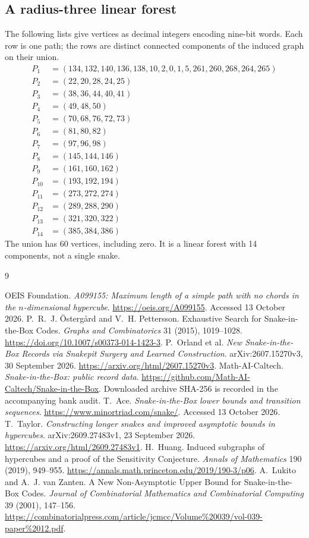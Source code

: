 \documentclass[11pt,a4paper]{article}
\theoremstyle{definition}
\theoremstyle{remark}
\begin{document}
\subsection{A radius-three linear forest}\label{app:radius-three}
The following lists give vertices as decimal integers encoding nine-bit words. Each row is one path; the rows are distinct connected components of the induced graph on their union.
\begin{align*}
P_{1}&=(134,132,140,136,138,10,2,0,1,5,261,260,268,264,265)\\
P_{2}&=(22,20,28,24,25)\\
P_{3}&=(38,36,44,40,41)\\
P_{4}&=(49,48,50)\\
P_{5}&=(70,68,76,72,73)\\
P_{6}&=(81,80,82)\\
P_{7}&=(97,96,98)\\
P_{8}&=(145,144,146)\\
P_{9}&=(161,160,162)\\
P_{10}&=(193,192,194)\\
P_{11}&=(273,272,274)\\
P_{12}&=(289,288,290)\\
P_{13}&=(321,320,322)\\
P_{14}&=(385,384,386)
\end{align*}
The union has 60 vertices, including zero. It is a linear forest with 14 components, not a single snake.

\begin{thebibliography}{9}\raggedright
{} OEIS Foundation. \emph{A099155: Maximum length of a simple path with no chords in the $n$-dimensional hypercube}. \url{https://oeis.org/A099155}. Accessed 13 October 2026.
 P.~R.~J. Östergård and V.~H. Pettersson. Exhaustive Search for Snake-in-the-Box Codes. \emph{Graphs and Combinatorics} 31 (2015), 1019--1028. \url{https://doi.org/10.1007/s00373-014-1423-3}.
 P.~Orland et al. \emph{New Snake-in-the-Box Records via Snakepit Surgery and Learned Construction}. arXiv:2607.15270v3, 30 September 2026. \url{https://arxiv.org/html/2607.15270v3}.
 Math-AI-Caltech. \emph{Snake-in-the-Box: public record data}. \url{https://github.com/Math-AI-Caltech/Snake-in-the-Box}. Downloaded archive SHA-256 is recorded in the accompanying bank audit.
 T.~Ace. \emph{Snake-in-the-Box lower bounds and transition sequences}. \url{https://www.minortriad.com/snake/}. Accessed 13 October 2026.
 T.~Taylor. \emph{Constructing longer snakes and improved asymptotic bounds in hypercubes}. arXiv:2609.27483v1, 23 September 2026. \url{https://arxiv.org/html/2609.27483v1}.
 H.~Huang. Induced subgraphs of hypercubes and a proof of the Sensitivity Conjecture. \emph{Annals of Mathematics} 190 (2019), 949--955. \url{https://annals.math.princeton.edu/2019/190-3/p06}.
 A.~Lukito and A.~J. van Zanten. A New Non-Asymptotic Upper Bound for Snake-in-the-Box Codes. \emph{Journal of Combinatorial Mathematics and Combinatorial Computing} 39 (2001), 147--156. \url{https://combinatorialpress.com/article/jcmcc/Volume%20039/vol-039-paper%2012.pdf}.
\end{thebibliography}
\end{document}
